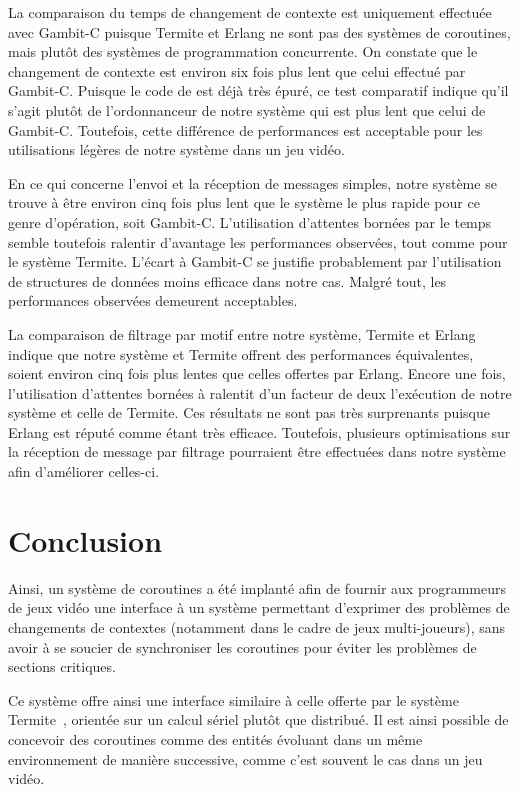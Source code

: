 \documentclass[12pt,twoside,letterpaper,francais]{book}
\newcommand{\scheme}[1]{\selectlanguage{english}{\tt #1}\selectlanguage{french}}
\begin{document}
La comparaison du temps de changement de contexte est uniquement
effectuée avec Gambit-C puisque Termite et Erlang ne sont pas des
systèmes de coroutines, mais plutôt des systèmes de programmation
concurrente. On constate que le changement de contexte est environ six
fois plus lent que celui effectué par Gambit-C. Puisque le code de
\scheme{yield} est déjà très épuré, ce test comparatif indique qu'il
s'agit plutôt de l'ordonnanceur de notre système qui est plus lent que
celui de Gambit-C. Toutefois, cette différence de performances est
acceptable pour les utilisations légères de notre système dans un jeu
vidéo.

En ce qui concerne l'envoi et la réception de messages simples, notre
système se trouve à être environ cinq fois plus lent que le système le
plus rapide pour ce genre d'opération, soit Gambit-C. L'utilisation
d'attentes bornées par le temps semble toutefois ralentir d'avantage
les performances observées, tout comme pour le système Termite.
L'écart à Gambit-C se justifie probablement par l'utilisation de
structures de données moins efficace dans notre cas. Malgré tout, les
performances observées demeurent acceptables.

La comparaison de filtrage par motif entre notre système, Termite et
Erlang indique que notre système et Termite offrent des performances
équivalentes, soient environ cinq fois plus lentes que celles offertes
par Erlang. Encore une fois, l'utilisation d'attentes bornées à
ralentit d'un facteur de deux l'exécution de notre système et celle de
Termite.  Ces résultats ne sont pas très surprenants puisque Erlang
est réputé comme étant très efficace. Toutefois, plusieurs
optimisations sur la réception de message par filtrage pourraient être
effectuées dans notre système afin d'améliorer celles-ci.


\FloatBarrier
\section{Conclusion}
Ainsi, un système de coroutines a été implanté afin de fournir aux
programmeurs de jeux vidéo une interface à un système permettant
d'exprimer des problèmes de changements de contextes (notamment dans
le cadre de jeux multi-joueurs), sans avoir à se soucier de
synchroniser les coroutines pour éviter les problèmes de sections
critiques.

Ce système offre ainsi une interface similaire à celle offerte par le
système Termite~\cite{Termite_paper}, orientée sur un calcul sériel
plutôt que distribué. Il est ainsi possible de concevoir des
coroutines comme des entités évoluant dans un même environnement de
manière successive, comme c'est souvent le cas dans un jeu vidéo.
\end{document}
